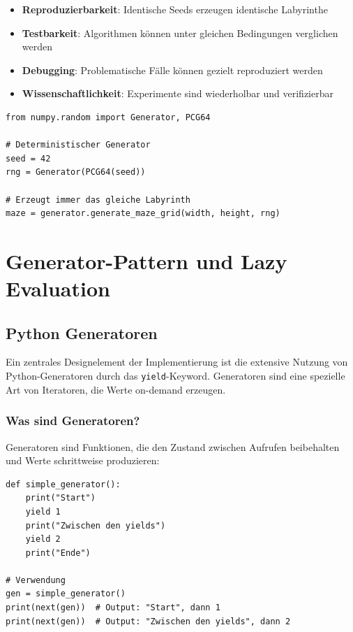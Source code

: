 \documentclass[12pt,a4paper]{article}
\begin{document}
\begin{itemize}
    \item \textbf{Reproduzierbarkeit}: Identische Seeds erzeugen identische Labyrinthe
    \item \textbf{Testbarkeit}: Algorithmen können unter gleichen Bedingungen verglichen werden
    \item \textbf{Debugging}: Problematische Fälle können gezielt reproduziert werden
    \item \textbf{Wissenschaftlichkeit}: Experimente sind wiederholbar und verifizierbar
\end{itemize}

\begin{lstlisting}[caption={Beispiel für deterministische Maze-Generierung}]
from numpy.random import Generator, PCG64

# Deterministischer Generator
seed = 42
rng = Generator(PCG64(seed))

# Erzeugt immer das gleiche Labyrinth
maze = generator.generate_maze_grid(width, height, rng)
\end{lstlisting}

\section{Generator-Pattern und Lazy Evaluation}

\subsection{Python Generatoren}

Ein zentrales Designelement der Implementierung ist die extensive Nutzung von Python-Generatoren durch das \texttt{yield}-Keyword. Generatoren sind eine spezielle Art von Iteratoren, die Werte on-demand erzeugen.

\subsubsection{Was sind Generatoren?}

Generatoren sind Funktionen, die den Zustand zwischen Aufrufen beibehalten und Werte schrittweise produzieren:

\begin{lstlisting}[caption={Einfaches Generator-Beispiel}]
def simple_generator():
    print("Start")
    yield 1
    print("Zwischen den yields")
    yield 2
    print("Ende")

# Verwendung
gen = simple_generator()
print(next(gen))  # Output: "Start", dann 1
print(next(gen))  # Output: "Zwischen den yields", dann 2
\end{lstlisting}
\end{document}
